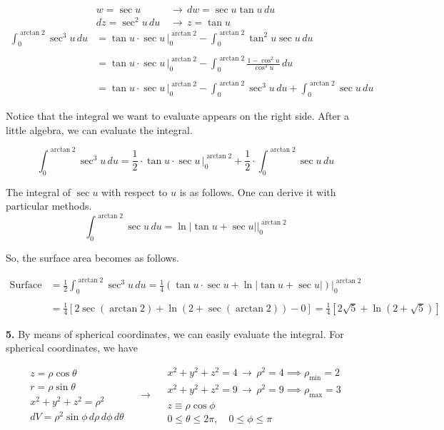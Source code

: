 \documentclass{article}
\begin{document}
\begin{align*}
    w=\sec u\,&\rightarrow\, dw = \sec u\tan u \,du\\
    dz=\sec^2u\,du\,&\rightarrow\, z = \tan u
\end{align*}
\begin{align*}
\int_0^{\arctan2}\sec^3u\,du&=\tan u \cdot \sec u\,\bigg|_0^{\arctan2} -\int_0^{\arctan2} \tan^2 u\sec u\, du\\\\&= \tan u \cdot \sec u\,\bigg|_0^{\arctan2} -\int_0^{\arctan2} \frac{1-\cos^2u}{\cos^3 u}\, du\\\\&= \tan u \cdot \sec u\,\bigg|_0^{\arctan2} - \int_0^{\arctan2} \sec^3u \, du + \int_0^{\arctan2} \sec u \, du 
\end{align*}

Notice that the integral we want to evaluate appears on the right side. After a little algebra, we can evaluate the integral.

\[
\int_0^{\arctan2}\sec^3u\,du=\frac12\cdot\tan u\cdot\sec u\,\bigg|_0^{\arctan2}+\frac12\cdot\int_0^{\arctan2}\sec u\,du
\]

The integral of $\sec u$ with respect to $u$ is as follows. One can derive it with particular methods.
\[\int_0^{\arctan2}\sec u \, du = \ln\left|\tan u + \sec u\right|\bigg|_0^{\arctan2}\]

So, the surface area becomes as follows.

\begin{align*}\text{Surface area}&=\frac12\int_0^{\arctan2}\sec^3u\,du=\frac14\left(\tan u\cdot\sec u+\ln\left|\tan u+\sec u\right|\right)\bigg|_0^{\arctan2}\\\\&=\frac14\left[2\sec(\arctan2)+ \ln(2+\sec(\arctan2))-0\right]=\boxed{\frac14\left[2\sqrt5+\ln\left(2+\sqrt5\right)\right]}\end{align*}

\vspace{1em}

\textbf{5.} By means of spherical coordinates, we can easily evaluate the integral. For spherical coordinates, we have

\[
\begin{array}{c}
z=\rho\cos\theta\\
r=\rho\sin\theta\\
x^2+y^2+z^2=\rho^2\\
dV=\rho^2\sin\phi\,d\rho\,d\phi\,d\theta
\end{array}\quad\rightarrow\quad
\begin{array}{c}
x^2+y^2+z^2=4\,\rightarrow\,\rho^2 = 4\implies \rho_{\text{min}}=2\\
x^2+y^2+z^2=9\,\rightarrow\,\rho^2 = 9\implies \rho_{\text{max}}=3\\
z\equiv\rho\cos\phi\\
0\leq\theta\leq2\pi,\quad0\leq\phi\leq\pi
\end{array}
\]
\end{document}
